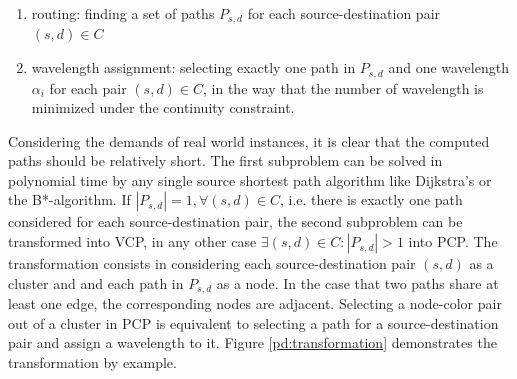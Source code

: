 \begin{enumerate}
\item routing: finding a set of paths $P_{s,d}$ for each source-destination pair $(s,d) \in C$
\item wavelength assignment: selecting exactly one path in $P_{s,d}$ and one wavelength $\alpha_i$ for each pair $(s,d) \in C$, in the way that the number of wavelength is minimized under the continuity constraint.
\end{enumerate}

Considering the demands of real world instances, it is clear that the computed paths should be relatively short. The first subproblem can be solved in polynomial time by any single source shortest path algorithm like Dijkstra's or the B*-algorithm. If $\left\vert{P_{s,d}}\right\vert = 1, \forall (s,d)\in C$, i.e. there is exactly one path considered for each source-destination pair, the second subproblem can be transformed into VCP, in any other case $\exists (s,d)\in C : \left\vert{P_{s,d}}\right\vert > 1$ into PCP. The transformation consists in considering each source-destination pair $(s,d)$ as a cluster and and each path in $P_{s,d}$ as a node. In the case that two paths share at least one edge, the corresponding nodes are adjacent. Selecting a node-color pair out of a cluster in PCP is equivalent to selecting a path for a source-destination pair and assign a wavelength to it. Figure \ref{pd:transformation} demonstrates the transformation by example.


